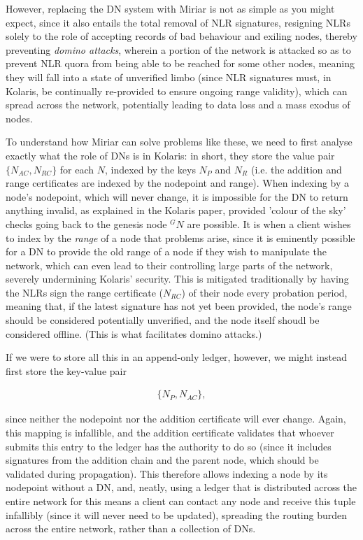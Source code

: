 \documentclass{extreport}
\begin{document}
However, replacing the DN system with Miriar is not as simple as you might expect, since it also entails the total removal of NLR signatures, resigning NLRs solely to the role of accepting records of bad behaviour and exiling nodes, thereby preventing \emph{domino attacks}, wherein a portion of the network is attacked so as to prevent NLR quora from being able to be reached for some other nodes, meaning they will fall into a state of unverified limbo (since NLR signatures must, in Kolaris, be continually re-provided to ensure ongoing range validity), which can spread across the network, potentially leading to data loss and a mass exodus of nodes.

To understand how Miriar can solve problems like these, we need to first analyse exactly what the role of DNs is in Kolaris: in short, they store the value pair \(\{ N_{AC}, N_{RC} \}\) for each \(N\), indexed by the keys \(N_P\) and \(N_R\) (i.e. the addition and range certificates are indexed by the nodepoint and range). When indexing by a node's nodepoint, which will never change, it is impossible for the DN to return anything invalid, as explained in the Kolaris paper, provided 'colour of the sky' checks going back to the genesis node \(^GN\) are possible. It is when a client wishes to index by the \emph{range} of a node that problems arise, since it is eminently possible for a DN to provide the old range of a node if they wish to manipulate the network, which can even lead to their controlling large parts of the network, severely undermining Kolaris' security. This is mitigated traditionally by having the NLRs sign the range certificate (\(N_{RC}\)) of their node every probation period, meaning that, if the latest signature has not yet been provided, the node's range should be considered potentially unverified, and the node itself shoudl be considered offline. (This is what facilitates domino attacks.)

If we were to store all this in an append-only ledger, however, we might instead first store the key-value pair

\begin{align*}
\{ N_P, N_{AC} \}, \tag{7.1}
\end{align*}

since neither the nodepoint nor the addition certificate will ever change. Again, this mapping is infallible, and the addition certificate validates that whoever submits this entry to the ledger has the authority to do so (since it includes signatures from the addition chain and the parent node, which should be validated during propagation). This therefore allows indexing a node by its nodepoint without a DN, and, neatly, using a ledger that is distributed across the entire network for this means a client can contact any node and receive this tuple infallibly (since it will never need to be updated), spreading the routing burden across the entire network, rather than a collection of DNs.
\end{document}
